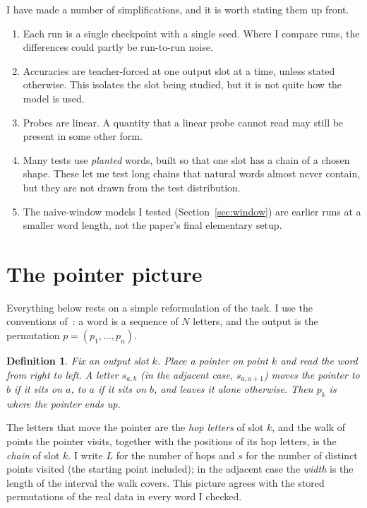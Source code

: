 \documentclass[11pt,a4paper]{article}
\newtheorem*{definition*}{Definition}
\begin{document}
I have made a number of simplifications, and it is worth stating them up front.
\begin{enumerate}
  \item Each run is a single checkpoint with a single seed. Where I compare runs, the differences could partly be run-to-run noise.
  \item Accuracies are teacher-forced at one output slot at a time, unless stated otherwise. This isolates the slot being studied, but it is not quite how the model is used.
  \item Probes are linear. A quantity that a linear probe cannot read may still be present in some other form.
  \item Many tests use \emph{planted} words, built so that one slot has a chain of a chosen shape. These let me test long chains that natural words almost never contain, but they are not drawn from the test distribution.
  \item The naive-window models I tested (Section~\ref{sec:window}) are earlier runs at a smaller word length, not the paper's final elementary setup.
\end{enumerate}

\section{The pointer picture}\label{sec:pointer}

Everything below rests on a simple reformulation of the task. I use the conventions of~\cite{paper}: a word is a sequence of $N$ letters, and the output is the permutation $p=(p_1,\dots,p_n)$.

\begin{definition*}
Fix an output slot $k$. Place a pointer on point $k$ and read the word \emph{from right to left}. A letter $s_{a,b}$ (in the adjacent case, $s_{a,a+1}$) moves the pointer to $b$ if it sits on $a$, to $a$ if it sits on $b$, and leaves it alone otherwise. Then $p_k$ is where the pointer ends up.
\end{definition*}

The letters that move the pointer are the \emph{hop letters} of slot $k$, and the walk of points the pointer visits, together with the positions of its hop letters, is the \emph{chain} of slot $k$. I write $L$ for the number of hops and $s$ for the number of distinct points visited (the starting point included); in the adjacent case the \emph{width} is the length of the interval the walk covers. This picture agrees with the stored permutations of the real data in every word I checked.
\end{document}
